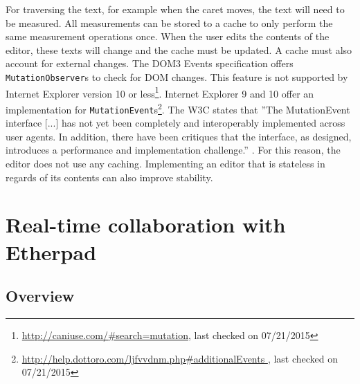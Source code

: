 For traversing the text, for example when the caret moves, the text will need to be measured. All measurements can be stored to a cache to only perform the same measurement operations once. When the user edits the contents of the editor, these texts will change and the cache must be updated. A cache must also account for external changes. The DOM3 Events specification \cite{UIEV} offers \texttt{MutationObserver}s to check for DOM changes. This feature is not supported by Internet Explorer version 10 or less\footnote{\url{http://caniuse.com/\#search=mutation}, last checked on 07/21/2015}. Internet Explorer 9 and 10 offer an implementation for \texttt{MutationEvent}s\footnote{\url{http://help.dottoro.com/ljfvvdnm.php\#additionalEvents }, last checked on 07/21/2015}. The W3C states that ''The MutationEvent interface [...] has not yet been completely and interoperably implemented across user agents. In addition, there have been critiques that the interface, as designed, introduces a performance and implementation challenge.'' \cite[Legacy MutationEvent events]{UIEV}. For this reason, the editor does not use any caching. Implementing an editor that is stateless in regards of its contents can also improve stability.





\section{Real-time collaboration with Etherpad} 
\label{sec:etherpad}

\subsection{Overview}

